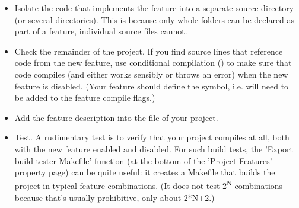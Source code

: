 \begin{itemize}
    \item{Isolate the code that implements the feature into a separate source directory
      (or several directories). This is because only whole folders can be
      declared as part of a feature, individual source files cannot.}

      \item{Check the remainder of the project. If you find source lines that reference
        code from the new feature, use conditional compilation ()
        to make sure that code compiles (and either works sensibly or throws an error)
        when the new feature is disabled. (Your feature should define the 
        symbol, i.e.  will need to be added to the feature compile flags.)}

    \item{Add the feature description into the  file of your project.}

    \item{Test. A rudimentary test is to verify that your project compiles at all, both
      with the new feature enabled and disabled. For such build tests, the
      'Export build tester Makefile' function (at the bottom of the 'Project Features'
      property page) can be quite useful: it creates a Makefile that builds the
      project in typical feature combinations. (It does not test 2\textsuperscript{N} combinations because
      that's usually prohibitive, only about 2*N+2.)}
\end{itemize}


